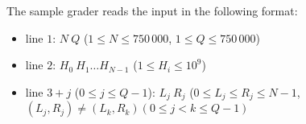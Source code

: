 
The sample grader reads the input in the following format:
\begin{itemize}
    \item line $1$: $N\ Q$ ($1\le N \le 750\,000$, $1\le Q \le 750\,000$)
\item line $2$: $H_0\ H_1\ldots H_{N-1}$ ($1\le H_i \le 10^9$)
\item line $3 + j$ ($0\le j\le Q-1$): $L_j\ R_j$ ($0 \le L_j \le R_j \le N -1$, $(L_j, R_j) \ne (L_k, R_k) (0\le j < k \le Q-1)$
\end{itemize}



